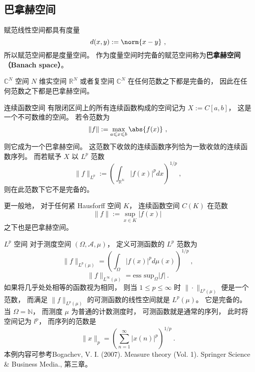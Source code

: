 

\subsection{巴拿赫空间}

赋范线性空间都具有度量
\begin{equation}
d(x,y) := \norm{x-y}~,
\end{equation}
所以赋范空间都是度量空间。 作为度量空间时完备的赋范空间称为\textbf{巴拿赫空间（Banach space）}。

\begin{example}{$\mathbb C^N$ 空间}
$N$ 维实空间 $\mathbb R^N$ 或者复空间 $\mathbb C^N$ 在任何范数之下都是完备的， 因此在任何范数之下都是巴拿赫空间。
\end{example}

\begin{example}{连续函数空间}
有限闭区间上的所有连续函数构成的空间记为 $X := C[a, b]$， 这是一个不可数维的空间。 若令范数为
$$
\|{f}\|:= \max_{a \leqslant x \leqslant b} \abs{f(x)}~,
$$
则它成为一个巴拿赫空间。 这范数下收敛的连续函数序列恰为一致收敛的连续函数序列。 而若赋予 $X$ 以 $L^p$ 范数
$$
\|f\|_{L^p}:=\left(\int_{\mathbb{R^N}}|f(x)|^pdx\right)^{1/p}~,
$$
则在此范数下它不是完备的。

更一般地， 对于任何紧 Hausforff 空间 $K$， 连续函数空间 $C(K)$ 在范数
$$
\|f\|:=\sup_{x\in K}|f(x)|~
$$
之下也是巴拿赫空间。
\end{example}

\begin{example}{$L^p$ 空间}
对于测度空间 $(\Omega,\mathcal{A},\mu)$， 定义可测函数的 $L^p$ 范数为
$$
\|f\|_{L^p(\mu)}=\left(\int_\Omega |f(x)|^pd\mu(x)\right)^{1/p}~,
$$
$$
\|f\|_{L^\infty(\mu)}=\text{ess sup}_{\Omega}|f|~.
$$
如果将几乎处处相等的函数视为相同， 则当 $1\leq p\leq\infty$ 时 $\|\cdot\|_{L^p(\mu)}$ 便是一个范数， 而满足 $\|f\|_{L^p(\mu)}$ 的可测函数的线性空间就是 $L^p(\mu)$。 它是完备的。 当 $\Omega=\mathbb{N}$， 而测度 $\mu$ 为普通的计数测度时， 可测函数就是通常的序列， 此时将空间记为 $l^p$， 而序列的范数是
$$
\|x\|_p=\left(\sum_{n=1}^\infty|x(n)|^p\right)^{1/p}~.
$$
本例内容可参考Bogachev, V. I. (2007). Measure theory (Vol. 1). Springer Science \& Business Media., 第三章。
\end{example}

